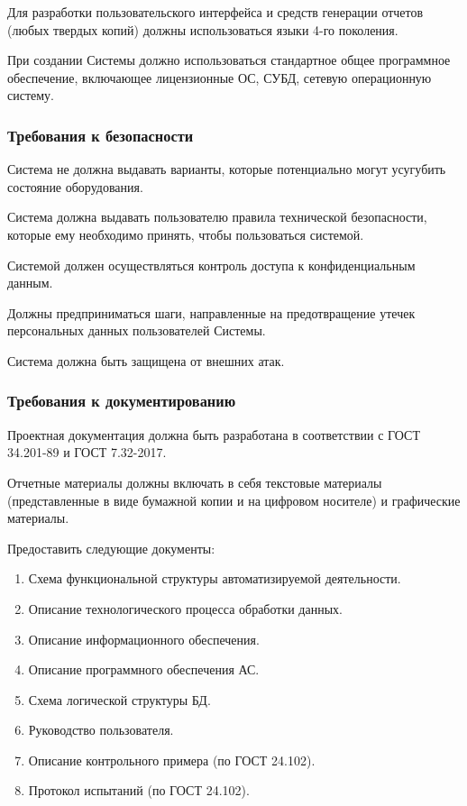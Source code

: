 \documentclass[a4paper,14pt]{extarticle}
\begin{document}
Для разработки пользовательского интерфейса и средств генерации отчетов (любых твердых копий) должны использоваться языки 4-го поколения.

При создании Системы должно использоваться стандартное общее программное обеспечение, включающее лицензионные ОС, СУБД, сетевую операционную систему.



\subsubsection{Требования к безопасности}
Система не должна выдавать варианты, которые потенциально могут
усугубить состояние оборудования.

Система должна выдавать пользователю правила технической безопасности, которые ему необходимо принять, чтобы пользоваться системой.

Системой должен осуществляться контроль доступа к конфиденциальным данным.

Должны предприниматься шаги, направленные на предотвращение утечек персональных данных пользователей Системы.

Система должна быть защищена от внешних атак.

\subsubsection{Требования к документированию}
Проектная документация должна быть разработана в соответствии с
ГОСТ 34.201-89 и ГОСТ 7.32-2017.

Отчетные материалы должны включать в себя текстовые материалы
(представленные в виде бумажной копии и на цифровом носителе) и графические материалы.

Предоставить следующие документы:

\begin{enumerate}
	\item Схема функциональной структуры автоматизируемой деятельности.
	\item  Описание технологического процесса обработки данных.
	\item  Описание информационного обеспечения.
	\item  Описание программного обеспечения АС.
	\item  Схема логической структуры БД.
	\item  Руководство пользователя.
	\item  Описание контрольного примера (по ГОСТ 24.102).
	\item  Протокол испытаний (по ГОСТ 24.102).
	
\end{enumerate}
\end{document}
